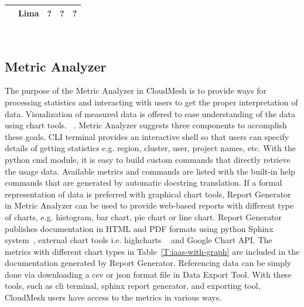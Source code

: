 \documentclass{tex/sig-alternate}
\begin{document}
{\begin{table}[h!]
\begin{small}
\begin{tabularx}{\columnwidth}{|l|X|X|X|}
    ~~Lima     & ?       &  ?      &  ?       \\   
    \hline
  \end{tabularx}\\
\end{small}
\end{table}

\subsection{Metric Analyzer}

The purpose of the Metric Analyzer in CloudMesh is to provide ways for processing statistics and interacting with users to get the proper interpretation of data. Visualization of measured data is offered to ease understanding of the data using chart tools. ~\cite{kosslyn1989understanding,pinker1990theory,friel2001making}. Metric Analyzer suggests three components to accomplish these goals. CLI terminal provides an interactive shell so that users can specify details of getting statistics e.g. region, cluster, user, project names, etc. With the python cmd module, it is easy to build custom commands that directly retrieve the usage data. Available metrics and commands are listed with the built-in help commands that are generated by automatic docstring translation. If a formal representation of data is preferred with graphical chart tools, Report Generator in Metric Analyzer can be used to provide web-based reports with different type of charts, e.g. histogram, bar chart, pie chart or line chart. Report Generator publishes documentation in HTML and PDF formats using python Sphinx system~\cite{brandl2009sphinx}, external chart tools i.e. highcharts ~\cite{highsoft2012highcharts} and Google Chart API. The metrics with different chart types in Table~\ref{T:iaas-with-graph} are included in the documentation generated by Report Generator. Referencing data can be simply done via downloading a csv or json format file in Data Export Tool. With these tools, such as cli terminal, sphinx report generator, and exporting tool, CloudMesh users have access to the metrics in various ways.


}
\end{document}
